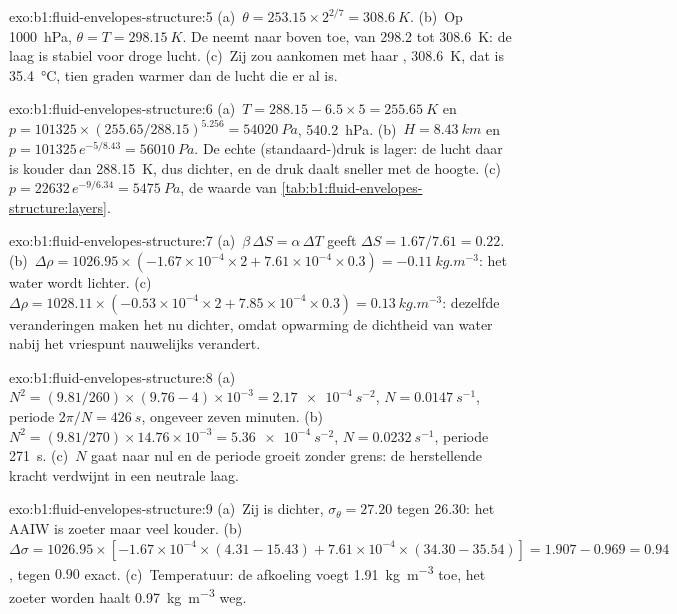 \begin{solution}{exo:b1:fluid-envelopes-structure:5}
(a)~$\theta = 253.15 \times 2^{2/7} = \qty{308.6}{K}$. (b)~Op \qty{1000}{hPa},
$\theta = T = \qty{298.15}{K}$. De  neemt naar boven toe, van
298.2 tot \qty{308.6}{K}: de laag is stabiel voor droge lucht. (c)~Zij zou aankomen met
haar , \qty{308.6}{K}, dat is \qty{35.4}{\celsius}, tien
graden warmer dan de lucht die er al is.
\end{solution}

\begin{solution}{exo:b1:fluid-envelopes-structure:6}
(a)~$T = 288.15 - 6.5 \times 5 = \qty{255.65}{K}$ en $p = \num{101325} \times
(255.65/288.15)^{5.256} = \qty{54020}{Pa}$, \qty{540.2}{hPa}. (b)~$H =
\qty{8.43}{km}$ en $p = \num{101325}\,e^{-5/8.43} = \qty{56010}{Pa}$. De echte
(standaard-)druk is lager: de lucht daar is kouder dan \qty{288.15}{K}, dus dichter, en de druk daalt sneller met de hoogte. (c)~$p = \num{22632}\,
e^{-9/6.34} = \qty{5475}{Pa}$, de waarde van
\cref{tab:b1:fluid-envelopes-structure:layers}.
\end{solution}

\begin{solution}{exo:b1:fluid-envelopes-structure:7}
(a)~$\beta\,\Delta S = \alpha\,\Delta T$ geeft $\Delta S = 1.67/7.61 = 0.22$.
(b)~$\Delta\rho = 1026.95 \times (-1.67\times10^{-4} \times 2 + 7.61\times10^{-4}
\times 0.3) = \qty{-0.11}{kg.m^{-3}}$: het water wordt lichter.
(c)~$\Delta\rho = 1028.11 \times (-0.53\times10^{-4} \times 2 + 7.85\times10^{-4}
\times 0.3) = \qty{+0.13}{kg.m^{-3}}$: dezelfde veranderingen maken het nu dichter, omdat opwarming de dichtheid van water nabij het vriespunt nauwelijks verandert.
\end{solution}

\begin{solution}{exo:b1:fluid-envelopes-structure:8}
(a)~$N^2 = (9.81/260) \times (9.76 - 4)\times10^{-3} = \qty{2.17e-4}{s^{-2}}$,
$N = \qty{0.0147}{s^{-1}}$, periode $2\pi/N = \qty{426}{s}$, ongeveer zeven
minuten. (b)~$N^2 = (9.81/270) \times 14.76\times10^{-3} = \qty{5.36e-4}{s^{-2}}$,
$N = \qty{0.0232}{s^{-1}}$, periode \qty{271}{s}. (c)~$N$ gaat naar nul en de
periode groeit zonder grens: de herstellende kracht verdwijnt in een neutrale laag.
\end{solution}

\begin{solution}{exo:b1:fluid-envelopes-structure:9}
(a)~Zij is dichter, $\sigma_\theta = 27.20$ tegen 26.30: het AAIW is zoeter maar veel
kouder. (b)~$\Delta\sigma = 1026.95 \times [-1.67\times10^{-4} \times
(4.31 - 15.43) + 7.61\times10^{-4} \times (34.30 - 35.54)] = 1.907 - 0.969 =
0.94$, tegen $0.90$ exact. (c)~Temperatuur: de afkoeling voegt
\qty{1.91}{kg.m^{-3}} toe, het zoeter worden haalt \qty{0.97}{kg.m^{-3}} weg.
\end{solution}

